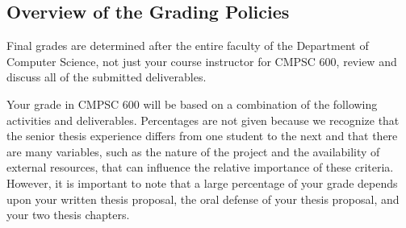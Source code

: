 \vspace*{-.15in}
\subsection*{Overview of the Grading Policies}

Final grades are determined after the entire faculty of the Department of Computer Science, not just your course
instructor for CMPSC 600, review and discuss all of the submitted deliverables.

Your grade in CMPSC 600 will be based on a combination of the following activities and deliverables. Percentages are not
given because we recognize that the senior thesis experience differs from one student to the next and that there are many
variables, such as the nature of the project and the availability of external resources, that can influence the relative
importance of these criteria. However, it is important to note that a large percentage of your grade depends upon your
written thesis proposal, the oral defense of your thesis proposal, and your two thesis chapters.

\vspace*{-.05in}

